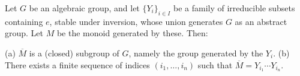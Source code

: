 Let $G$ be an algebraic group, and let $\{Y_i\}_{i \in I}$ be a family of irreducible subsets containing $e$, stable under inversion, whose union generates $G$ as an abstract group. Let $M$ be the monoid generated by these. Then:

(a) $\overline{M}$ is a (closed) subgroup of $G$, namely the group generated by the $Y_i$.
(b) There exists a finite sequence of indices $(i_1, \ldots, i_n)$ such that $\overline{M} = Y_{i_1} \cdots Y_{i_n}$.
